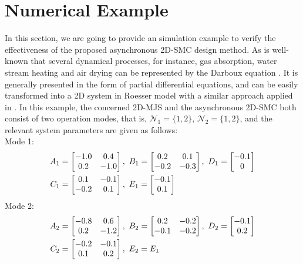 \documentclass[journal,final,twocolumn]{IEEEtran}
\begin{document}
\section{Numerical Example} \label{example}
In this section, we are going to provide an simulation example to verify the effectiveness of the proposed asynchronous 2D-SMC design method.  As is well-known that several dynamical processes, for instance, gas absorption,  water stream heating and air drying  can be represented by the Darboux equation \cite{marszalek1984two}. It is generally presented in the form of partial differential equations, and can be easily transformed into  a 2D system in Roesser model with a similar approach applied in \cite{du2001h}. In this example, the concerned 2D-MJS and the asynchronous  2D-SMC both consist of two operation modes, that is, $\mathcal{N}_1=\{1,2\}$, $ \mathcal{N}_{2}=\{1,2\}$,  and the relevant system parameters are given as follows: \\
Mode 1:
\begin{equation} \notag
\begin{aligned}
	A_{1} &= \begin{bmatrix}
	-1.0&0.4\\
	0.2&-1.0
	\end{bmatrix}, \ 
	B_{1} = \begin{bmatrix}
	0.2&0.1\\ -0.2&-0.3
	\end{bmatrix} ,\ 
	D_{1} = \begin{bmatrix}
		-0.1\\0
	\end{bmatrix} \\
	C_{1} &= \begin{bmatrix}
		0.1&-0.1\\-0.2&0.1
	\end{bmatrix},\ 
	E_{1} = \begin{bmatrix}
		-0.1\\ 0.1
	\end{bmatrix}
\end{aligned}  
\end{equation}
Mode 2:
\begin{equation} \notag
\begin{aligned}
A_{2} &=\begin{bmatrix}
-0.8&0.6\\
0.2&-1.2
\end{bmatrix}, \ 
B_{2} = \begin{bmatrix}
0.2&-0.2\\ -0.1&-0.2
\end{bmatrix} ,\ 
D_{2} = \begin{bmatrix}
-0.1\\0.2
\end{bmatrix} \\
C_{2} &= \begin{bmatrix}
-0.2&-0.1\\0.1&0.2
\end{bmatrix},\
E_{2} = E_{1}
\end{aligned}  
\end{equation}
\end{document}
